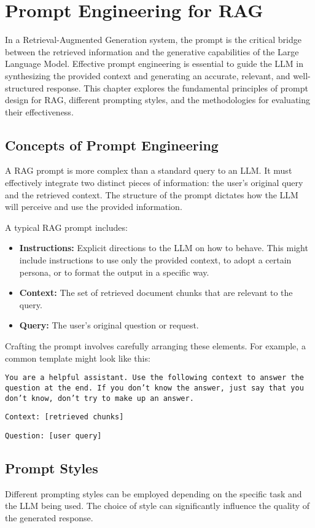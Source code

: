\chapter{Prompt Engineering for RAG}
\label{chap:prompt_engineering}

In a Retrieval-Augmented Generation system, the prompt is the critical bridge between the retrieved information and the generative capabilities of the Large Language Model. Effective prompt engineering is essential to guide the LLM in synthesizing the provided context and generating an accurate, relevant, and well-structured response. This chapter explores the fundamental principles of prompt design for RAG, different prompting styles, and the methodologies for evaluating their effectiveness.

\section{Concepts of Prompt Engineering}
A RAG prompt is more complex than a standard query to an LLM. It must effectively integrate two distinct pieces of information: the user's original query and the retrieved context. The structure of the prompt dictates how the LLM will perceive and use the provided information.

A typical RAG prompt includes:
\begin{itemize}
    \item \textbf{Instructions:} Explicit directions to the LLM on how to behave. This might include instructions to use only the provided context, to adopt a certain persona, or to format the output in a specific way.
    \item \textbf{Context:} The set of retrieved document chunks that are relevant to the query.
    \item \textbf{Query:} The user's original question or request.
\end{itemize}

Crafting the prompt involves carefully arranging these elements. For example, a common template might look like this:

\texttt{You are a helpful assistant. Use the following context to answer the question at the end. If you don't know the answer, just say that you don't know, don't try to make up an answer.}

\texttt{Context: [retrieved chunks]}

\texttt{Question: [user query]}

\section{Prompt Styles}
Different prompting styles can be employed depending on the specific task and the LLM being used. The choice of style can significantly influence the quality of the generated response.

